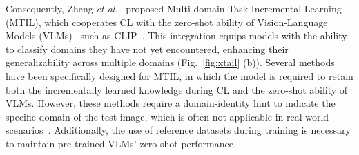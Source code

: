 \documentclass{article}
\begin{document}
Consequently, Zheng \textit{et al.}~\cite{Zheng_2023_ICCV} proposed Multi-domain Task-Incremental Learning (MTIL), which cooperates CL with the zero-shot ability of Vision-Language Models (VLMs)~\cite{li2021align,kim2021vilt,radford2021learning,li2022blip} such as CLIP~\cite{radford2021learning}. This integration equips models with the ability to classify domains they have not yet encountered, enhancing their generalizability across multiple domains (Fig.~\ref{fig:xtail} (b)). Several methods~\cite{Zheng_2023_ICCV, yu2024boosting} have been specifically designed for MTIL, in which the model is required to retain both the incrementally learned knowledge during CL and the zero-shot ability of VLMs. However, these methods require a domain-identity hint to indicate the specific domain of the test image, which is often not applicable in real-world scenarios~\cite{rebuffi2017icarl}. Additionally, the use of reference datasets during training is necessary to maintain pre-trained VLMs' zero-shot performance.



\end{document}
